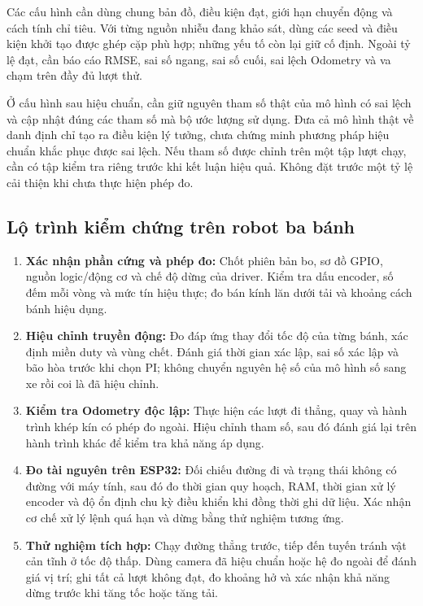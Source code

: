 \documentclass[12pt,a4paper,oneside]{report}
\begin{document}
Các cấu hình cần dùng chung bản đồ, điều kiện đạt, giới hạn chuyển động và cách tính chỉ tiêu. Với từng nguồn nhiễu đang khảo sát, dùng các seed và điều kiện khởi tạo được ghép cặp phù hợp; những yếu tố còn lại giữ cố định. Ngoài tỷ lệ đạt, cần báo cáo RMSE, sai số ngang, sai số cuối, sai lệch Odometry và va chạm trên đầy đủ lượt thử.

Ở cấu hình sau hiệu chuẩn, cần giữ nguyên tham số thật của mô hình có sai lệch và cập nhật đúng các tham số mà bộ ước lượng sử dụng. Đưa cả mô hình thật về danh định chỉ tạo ra điều kiện lý tưởng, chưa chứng minh phương pháp hiệu chuẩn khắc phục được sai lệch. Nếu tham số được chỉnh trên một tập lượt chạy, cần có tập kiểm tra riêng trước khi kết luận hiệu quả. Không đặt trước một tỷ lệ cải thiện khi chưa thực hiện phép đo.

\subsection{Lộ trình kiểm chứng trên robot ba bánh}

\begin{enumerate}[label=\arabic*.]
  \item \textbf{Xác nhận phần cứng và phép đo:} Chốt phiên bản bo, sơ đồ GPIO, nguồn logic/động cơ và chế độ dừng của driver. Kiểm tra dấu encoder, số đếm mỗi vòng và mức tín hiệu thực; đo bán kính lăn dưới tải và khoảng cách bánh hiệu dụng.
  \item \textbf{Hiệu chỉnh truyền động:} Đo đáp ứng thay đổi tốc độ của từng bánh, xác định miền duty và vùng chết. Đánh giá thời gian xác lập, sai số xác lập và bão hòa trước khi chọn PI; không chuyển nguyên hệ số của mô hình số sang xe rồi coi là đã hiệu chỉnh.
  \item \textbf{Kiểm tra Odometry độc lập:} Thực hiện các lượt đi thẳng, quay và hành trình khép kín có phép đo ngoài. Hiệu chỉnh tham số, sau đó đánh giá lại trên hành trình khác để kiểm tra khả năng áp dụng.
  \item \textbf{Đo tài nguyên trên ESP32:} Đối chiếu đường đi và trạng thái không có đường với máy tính, sau đó đo thời gian quy hoạch, RAM, thời gian xử lý encoder và độ ổn định chu kỳ điều khiển khi đồng thời ghi dữ liệu. Xác nhận cơ chế xử lý lệnh quá hạn và dừng bằng thử nghiệm tương ứng.
  \item \textbf{Thử nghiệm tích hợp:} Chạy đường thẳng trước, tiếp đến tuyến tránh vật cản tĩnh ở tốc độ thấp. Dùng camera đã hiệu chuẩn hoặc hệ đo ngoài để đánh giá vị trí; ghi tất cả lượt không đạt, đo khoảng hở và xác nhận khả năng dừng trước khi tăng tốc hoặc tăng tải.
\end{enumerate}
\end{document}

